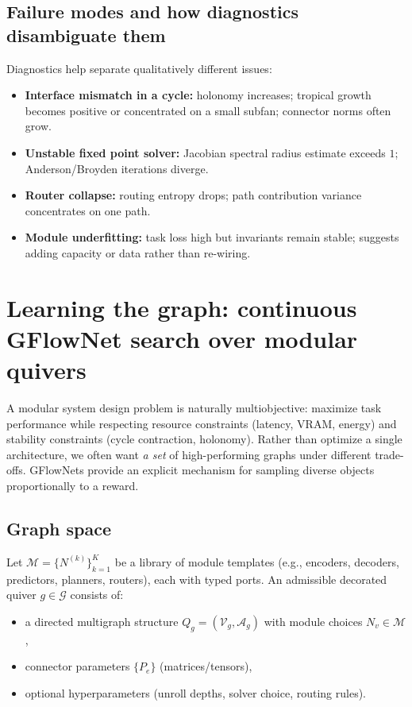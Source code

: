 \documentclass[11pt]{article}
\theoremstyle{definition}
\theoremstyle{plain}
\theoremstyle{remark}
\newcommand{\mc}[1]{\mathcal{#1}}
\newcommand{\Nodes}{\mc{V}}
\newcommand{\Edges}{\mc{A}}
\begin{document}
\subsection{Failure modes and how diagnostics disambiguate them}
\label{sec:diag-failures}

Diagnostics help separate qualitatively different issues:
\begin{itemize}[leftmargin=2em]
	\item \textbf{Interface mismatch in a cycle:} holonomy increases; tropical growth becomes positive or concentrated on a small subfan; connector norms often grow.
\item \textbf{Unstable fixed point solver:} Jacobian spectral radius estimate exceeds $1$; Anderson/Broyden iterations diverge.
\item \textbf{Router collapse:} routing entropy drops; path contribution variance concentrates on one path.
\item \textbf{Module underfitting:} task loss high but invariants remain stable; suggests adding capacity or data rather than re-wiring.
\end{itemize}

\newpage

\section{Learning the graph: continuous GFlowNet search over modular quivers}
\label{sec:gflownet}

A modular system design problem is naturally multiobjective: maximize task performance while respecting resource constraints (latency, VRAM, energy) and stability constraints (cycle contraction, holonomy).
Rather than optimize a single architecture, we often want \emph{a set} of high-performing graphs under different trade-offs.
GFlowNets provide an explicit mechanism for sampling diverse objects proportionally to a reward.

\subsection{Graph space}
Let $\mc{M}=\{N^{(k)}\}_{k=1}^K$ be a library of module templates (e.g., encoders, decoders, predictors, planners, routers), each with typed ports.
An admissible decorated quiver $g\in\mc{G}$ consists of:
\begin{itemize}[leftmargin=2em]
\item a directed multigraph structure $Q_g=(\Nodes_g,\Edges_g)$ with module choices $N_v\in\mc{M}$,
\item connector parameters $\{P_e\}$ (matrices/tensors),
\item optional hyperparameters (unroll depths, solver choice, routing rules).
\end{itemize}
\end{document}
